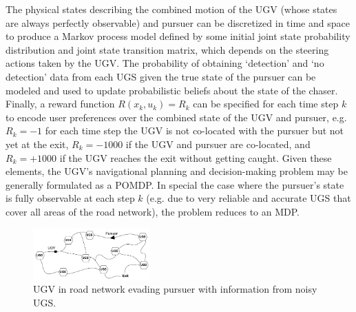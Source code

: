 The physical states describing the combined motion of the UGV (whose states are always perfectly observable) and pursuer can be discretized in time and space to produce a Markov process model defined by some initial joint state probability distribution and joint state transition matrix, which depends on the steering actions taken by the UGV. The probability of obtaining `detection' and `no detection' data from each UGS given the true state of the pursuer can be modeled and used to update probabilistic beliefs about the state of the chaser. Finally, a reward function $R(x_k,u_k) = R_k$ can be specified for each time step $k$ to encode user preferences over the combined state of the UGV and pursuer, e.g. $R_k = -1$ for each time step the UGV is not co-located with the pursuer but not yet at the exit, $R_k= -1000$ if the UGV and pursuer are co-located, and $R_k=+1000$ if the UGV reaches the exit without getting caught. Given these elements, the UGV's navigational planning and decision-making problem may be generally formulated as a POMDP. %
In special the case where the pursuer's state is fully observable at each step $k$ (e.g. due to very reliable and accurate UGS that cover all areas of the road network), the problem reduces to an MDP. 

    
	\begin{figure}[t]%
    	\centering
     	\includegraphics[width=0.4\textwidth]{Figures/RoadNet}
    	\caption{UGV in road network evading pursuer with information from noisy UGS.} 
        \label{fig:RoadNet}
    \end{figure}

